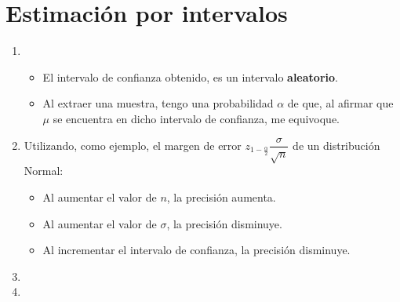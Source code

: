\section{Estimación por intervalos}
\begin{enumerate}[label=\color{red}\textbf{\arabic*)}]
  \item {}
    \begin{itemize}[label=\textbullet]
      \item El intervalo de confianza obtenido, es un intervalo \textbf{aleatorio}.
      \item Al extraer una muestra, tengo una probabilidad $\alpha$ de que, al afirmar que $\mu$ se encuentra en dicho intervalo de confianza, me equivoque.
    \end{itemize}
  \item {}

    Utilizando, como ejemplo, el margen de error $z_{1-\frac{\alpha}{2} }\dfrac{\sigma}{\sqrt{n} }$ de un distribución Normal:
    \begin{itemize}[label=\textbullet]
      \item Al aumentar el valor de $n$, la precisión aumenta.
      \item Al aumentar el valor de  $\sigma$, la precisión disminuye.
      \item Al incrementar el intervalo de confianza, la precisión disminuye.
    \end{itemize}
  \item {}
  \item {}
\end{enumerate}
